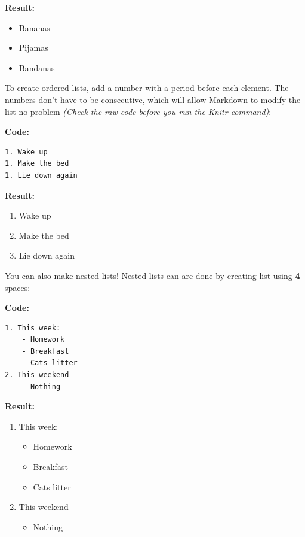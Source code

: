 \documentclass[
]{book}
\providecommand{\tightlist}{%
  \setlength{\itemsep}{0pt}\setlength{\parskip}{0pt}}
\begin{document}
\textbf{Result:}

\begin{itemize}
\tightlist
\item
  Bananas
\item
  Pijamas
\item
  Bandanas
\end{itemize}

To create ordered lists, add a number with a period before each element. The numbers don't have to be consecutive, which will allow Markdown to modify the list no problem \emph{(Check the raw code before you run the Knitr command)}:

\textbf{Code:}

\begin{verbatim}
1. Wake up
1. Make the bed
1. Lie down again
\end{verbatim}

\textbf{Result:}

\begin{enumerate}
\def\labelenumi{\arabic{enumi}.}
\tightlist
\item
  Wake up
\item
  Make the bed
\item
  Lie down again
\end{enumerate}

You can also make nested lists! Nested lists can are done by creating list using \textbf{4} spaces:

\textbf{Code:}

\begin{verbatim}
1. This week:
    - Homework
    - Breakfast
    - Cats litter
2. This weekend
    - Nothing
\end{verbatim}

\textbf{Result:}

\begin{enumerate}
\def\labelenumi{\arabic{enumi}.}
\tightlist
\item
  This week:

  \begin{itemize}
  \tightlist
  \item
    Homework
  \item
    Breakfast
  \item
    Cats litter
  \end{itemize}
\item
  This weekend

  \begin{itemize}
  \tightlist
  \item
    Nothing
  \end{itemize}
\end{enumerate}
\end{document}
